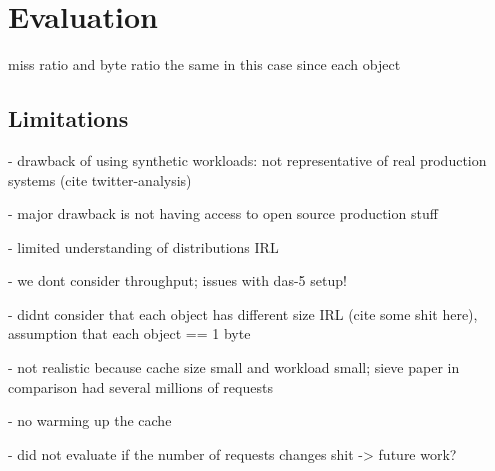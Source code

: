 \chapter{Evaluation}

miss ratio and byte ratio the same in this case since each object 

\section{Limitations}

- drawback of using synthetic workloads: not representative of real production systems (cite twitter-analysis)

- major drawback is not having access to open source production stuff

- limited understanding of distributions IRL

- we dont consider throughput; issues with das-5 setup!

- didnt consider that each object has different size IRL (cite some shit here), assumption that each object == 1 byte

- not realistic because cache size small and workload small; sieve paper in comparison had several millions of requests

- no warming up the cache

- did not evaluate if the number of requests changes shit -> future work?